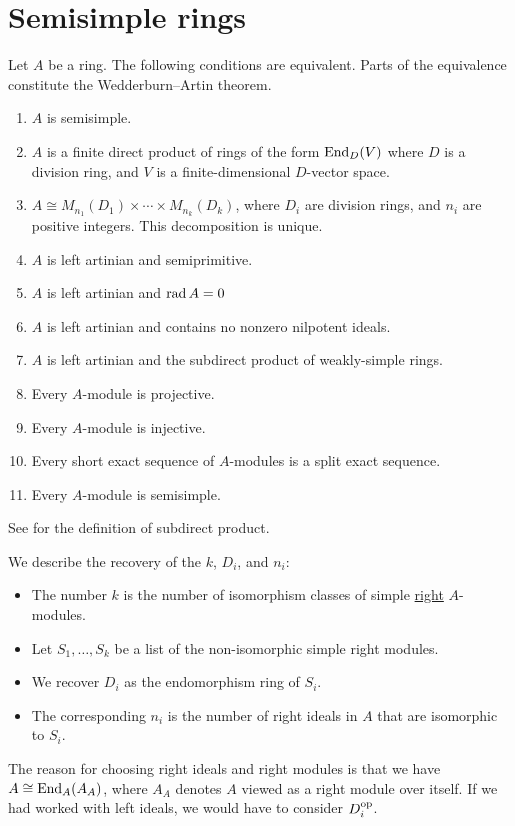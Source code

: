 \documentclass[12pt]{article}
\begin{document}
\section{Semisimple rings}

\begin{thm} \label{thm:semisimple-ring-equivalences}
	Let $A$ be a ring. The following conditions are equivalent. Parts of the equivalence constitute the Wedderburn--Artin theorem.
	\begin{enumerate}[label=(\alph*)]
		\item $A$ is semisimple.
		\item $A$ is a finite direct product of rings of the form $\operatorname{End}_{D}(V)$ where $D$ is a division ring, and $V$ is a finite-dimensional $D$-vector space.
		\item $A \cong M_{n_{1}}(D_{1}) \times \cdots \times M_{n_{k}}(D_{k})$, where $D_{i}$ are division rings, and $n_{i}$ are positive integers. \newline
		This decomposition is unique.
		\item $A$ is left artinian and semiprimitive.
		\item $A$ is left artinian and $\operatorname{rad} A = 0$
		\item $A$ is left artinian and contains no nonzero nilpotent ideals.
		\item $A$ is left artinian and the subdirect product of weakly-simple rings.
		\item Every $A$-module is projective.
		\item Every $A$-module is injective.
		\item Every short exact sequence of $A$-modules is a split exact sequence.
		\item Every $A$-module is semisimple.
	\end{enumerate}
\end{thm}
See  for the definition of subdirect product.

\begin{rem}
	We describe the recovery of the $k$, $D_{i}$, and $n_{i}$: 
	\begin{itemize}
		\item The number $k$ is the number of isomorphism classes of simple \underline{right} $A$-modules.
		\item Let $S_{1}, \ldots, S_{k}$ be a list of the non-isomorphic simple right modules.
		\item We recover $D_{i}$ as the endomorphism ring of $S_{i}$.
		\item The corresponding $n_{i}$ is the number of right ideals in $A$ that are isomorphic to $S_{i}$.
	\end{itemize}
	The reason for choosing right ideals and right modules is that 
	we have $A \cong \operatorname{End}_{A}(A_{A})$, where $A_{A}$ denotes $A$ viewed as a right module over itself. \newline
	If we had worked with left ideals, we would have to consider $D_{i}^{\operatorname{op}}$.
\end{rem}
\end{document}
